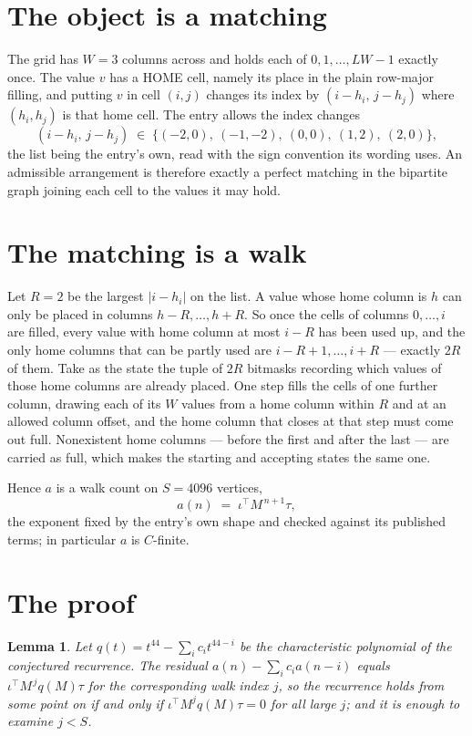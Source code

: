 \documentclass[11pt,a4paper]{article}
\theoremstyle{plain}
\newtheorem{lemma}[theorem]{Lemma}
\theoremstyle{definition}
\begin{document}
\section{The object is a matching}

The grid has $W=3$ columns across and holds each of $0,1,\dots,LW-1$ exactly once. The value
$v$ has a HOME cell, namely its place in the plain row-major filling, and putting $v$ in cell
$(i,j)$ changes its index by $(i-h_i,\,j-h_j)$ where $(h_i,h_j)$ is that home cell. The entry
allows the index changes
\[
(i-h_i,\,j-h_j)\;\in\;\{(-2,0),\ (-1,-2),\ (0,0),\ (1,2),\ (2,0)\},
\]
the list being the entry's own, read with the sign convention its wording uses. An admissible
arrangement is therefore exactly a perfect matching in the bipartite graph joining each cell to
the values it may hold.

\section{The matching is a walk}

Let $R=2$ be the largest $|i-h_i|$ on the list. A value whose home column is $h$ can only be
placed in columns $h-R,\dots,h+R$. So once the cells of columns $0,\dots,i$ are filled, every
value with home column at most $i-R$ has been used up, and the only home columns that can be
partly used are $i-R+1,\dots,i+R$ --- exactly $2R$ of them. Take as the state the tuple of
$2R$ bitmasks recording which values of those home columns are already placed. One step fills
the cells of one further column, drawing each of its $W$ values from a home column within $R$
and at an allowed column offset, and the home column that closes at that step must come out
full. Nonexistent home columns --- before the first and after the last --- are carried as
full, which makes the starting and accepting states the same one.

Hence $a$ is a walk count on $S=4096$ vertices,
\[
a(n)\;=\;\iota^{\!\top}M^{\,n+1}\tau ,
\]
the exponent fixed by the entry's own shape and checked against its published terms; in
particular $a$ is $C$-finite.

\section{The proof}

\begin{lemma}\label{lem:crit}
Let $q(t)=t^{44}-\sum_i c_it^{44-i}$ be the characteristic polynomial of the
conjectured recurrence. The residual $a(n)-\sum_ic_ia(n-i)$ equals
$\iota^{\!\top}M^{\,j}q(M)\tau$ for the corresponding walk index $j$, so the recurrence
holds from some point on if and only if $\iota^{\!\top}M^{j}q(M)\tau=0$ for all large $j$;
and it is enough to examine $j<S$.
\end{lemma}
\end{document}
